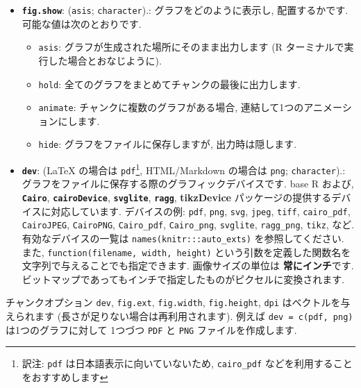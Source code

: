 \documentclass[
  11pt,
]{bxjsreport}
\providecommand{\tightlist}{%
  \setlength{\itemsep}{0pt}\setlength{\parskip}{0pt}}
\begin{document}
\begin{itemize}
\tightlist
\item
  \textbf{\texttt{fig.show}}: (\texttt{\textquotesingle{}asis\textquotesingle{}}; \texttt{character}).: グラフをどのように表示し, 配置するかです. 可能な値は次のとおりです.

  \begin{itemize}
  \tightlist
  \item
    \texttt{asis}: グラフが生成された場所にそのまま出力します (R ターミナルで実行した場合とおなじように).
  \item
    \texttt{hold}: 全てのグラフをまとめてチャンクの最後に出力します.
  \item
    \texttt{animate}: チャンクに複数のグラフがある場合, 連結して1つのアニメーションにします.
  \item
    \texttt{hide}: グラフをファイルに保存しますが, 出力時は隠します.
  \end{itemize}
\item
  \textbf{\texttt{dev}}: (LaTeX の場合は \texttt{\textquotesingle{}pdf\textquotesingle{}}\footnote{訳注: \texttt{pdf} は日本語表示に向いていないため, \texttt{cairo\_pdf} などを利用することをおすすめします}, HTML/Markdown の場合は \texttt{\textquotesingle{}png\textquotesingle{}}; \texttt{character}).: グラフをファイルに保存する際のグラフィックデバイスです. base R および, \textbf{\texttt{Cairo}}, \textbf{\texttt{cairoDevice}}, \textbf{\texttt{svglite}}, \textbf{\texttt{ragg}}, \textbf{tikzDevice} パッケージの提供するデバイスに対応しています. デバイスの例: \texttt{pdf}, \texttt{png}, \texttt{svg}, \texttt{jpeg}, \texttt{tiff}, \texttt{cairo\_pdf}, \texttt{CairoJPEG}, \texttt{CairoPNG}, \texttt{Cairo\_pdf}, \texttt{Cairo\_png}, \texttt{svglite}, \texttt{ragg\_png}, \texttt{tikz}, など. 有効なデバイスの一覧は \texttt{names(knitr:::auto\_exts)} を参照してください. また, \texttt{function(filename, width, height)} という引数を定義した関数名を文字列で与えることでも指定できます. 画像サイズの単位は \textbf{常にインチ}です. ビットマップであってもインチで指定したものがピクセルに変換されます.
\end{itemize}

チャンクオプション \texttt{dev}, \texttt{fig.ext}, \texttt{fig.width}, \texttt{fig.height}, \texttt{dpi} はベクトルを与えられます (長さが足りない場合は再利用されます). 例えば \texttt{dev = c(\textquotesingle{}pdf\textquotesingle{},\ \textquotesingle{}png\textquotesingle{})} は1つのグラフに対して 1つづつ \texttt{PDF} と \texttt{PNG} ファイルを作成します.
\end{document}
